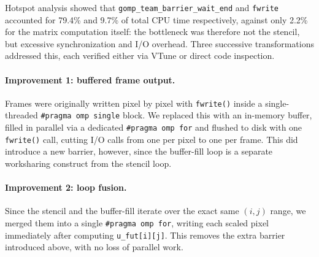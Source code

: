 Hotspot analysis showed that \texttt{gomp\_team\_barrier\_wait\_end} and
\texttt{fwrite} accounted for 79.4\% and 9.7\% of total CPU time
respectively, against only 2.2\% for the matrix computation itself: the
bottleneck was therefore not the stencil, but excessive synchronization
and I/O overhead. Three successive transformations addressed this, each
verified either via VTune or direct code inspection.

\paragraph{Improvement 1: buffered frame output.}
Frames were originally written pixel by pixel with \texttt{fwrite()}
inside a single-threaded \texttt{\#pragma omp single} block. We replaced
this with an in-memory buffer, filled in parallel via a dedicated
\texttt{\#pragma omp for} and flushed to disk with one \texttt{fwrite()}
call, cutting I/O calls from one per pixel to one per frame. This did
introduce a new barrier, however, since the buffer-fill loop is a
separate worksharing construct from the stencil loop.

\paragraph{Improvement 2: loop fusion.}
Since the stencil and the buffer-fill iterate over the exact same
$(i,j)$ range, we merged them into a single \texttt{\#pragma omp for},
writing each scaled pixel immediately after computing
\texttt{u\_fut[i][j]}. This removes the extra barrier introduced above,
with no loss of parallel work.

